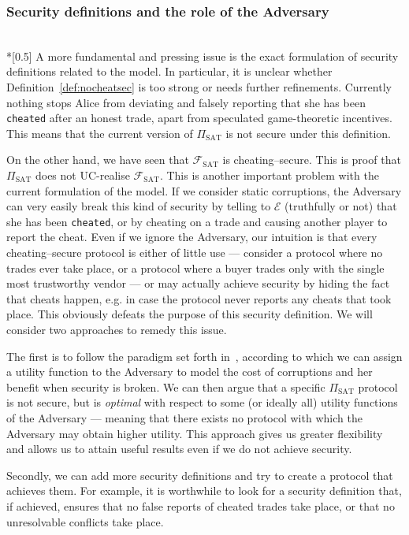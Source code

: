 \subsubsection{Security definitions and the role of the Adversary} \ \\*[0.5\baselineskip]
  A more fundamental and pressing issue is the exact formulation of security definitions
  related to the model. In particular, it is unclear whether
  Definition~\ref{def:nocheatsec} is too strong or needs further refinements. Currently
  nothing stops Alice from deviating and falsely reporting that she has been
  \texttt{cheated} after an honest trade, apart from speculated game-theoretic incentives.
  This means that the current version of $\Pi_{\mathrm{SAT}}$ is not secure under this
  definition.

  On the other hand, we have seen that $\mathcal{F}_{\mathrm{SAT}}$ is cheating--secure.
  This is proof that $\Pi_{\mathrm{SAT}}$ does not UC-realise
  $\mathcal{F}_{\mathrm{SAT}}$. This is another important problem with the current
  formulation of the model. If we consider static corruptions, the Adversary can very
  easily break this kind of security by telling to $\mathcal{E}$ (truthfully or not) that
  she has been \texttt{cheated}, or by cheating on a trade and causing another player to
  report the cheat. Even if we ignore the Adversary, our intuition is that every
  cheating--secure protocol is either of little use --- consider a protocol where no
  trades ever take place, or a protocol where a buyer trades only with the single most
  trustworthy vendor --- or may actually achieve security by hiding the fact that cheats
  happen, e.g. in case the protocol never reports any cheats that took place. This
  obviously defeats the purpose of this security definition. We will consider two
  approaches to remedy this issue.

  The first is to follow the paradigm set forth in~\cite{rationalprotocol}, according to
  which we can assign a utility function to the Adversary to model the cost of corruptions
  and her benefit when security is broken. We can then argue that a specific
  $\Pi_{\mathrm{SAT}}$ protocol is not secure, but is \textit{optimal} with respect to
  some (or ideally all) utility functions of the Adversary --- meaning that there exists
  no protocol with which the Adversary may obtain higher utility. This approach gives us
  greater flexibility and allows us to attain useful results even if we do not achieve
  security.

  Secondly, we can add more security definitions and try to create a protocol that
  achieves them. For example, it is worthwhile to look for a security definition that, if
  achieved, ensures that no false reports of cheated trades take place, or that no
  unresolvable conflicts take place.

